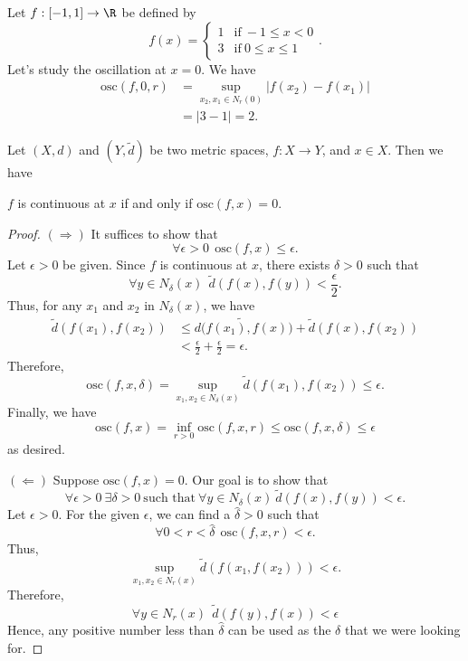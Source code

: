 \begin{eg}
    Let \( f:[-1,1] \to \R  \) be defined by 
    \[  f(x) = 
    \begin{cases}
        1 &\text{if} \ -1 \leq x < 0 \\ 
        3 &\text{if} \ 0 \leq x \leq 1 
    \end{cases}. \]
    Let's study the oscillation at \( x = 0  \). We have 
    \begin{align*}
        \text{osc}(f,0,r) &=  \sup_{{x}_{2},{x}_{1} \in {N}_{r}(0) } | f({x}_{2}) - f({x}_{1}) | \\
                          &= |  3 - 1  |  = 2.
    \end{align*}
\end{eg}

\begin{theorem}[ ]
    Let \( (X,d) \) and \( (Y, \tilde{d}) \) be two metric spaces, \( f: X \to Y  \), and \( x \in X  \). Then we have
    \begin{center}
        \( f  \) is continuous at \( x  \) if and only if \( \text{osc}(f,x) = 0 \).
    \end{center}
\end{theorem}
\begin{proof}
\( (\Longrightarrow) \) It suffices to show that 
\[  \forall \epsilon > 0 \ \ \text{osc}(f,x) \leq \epsilon. \]
Let \( \epsilon > 0  \) be given. Since \( f  \) is continuous at \( x  \), there exists \( \delta > 0  \) such that  
\[  \forall y \in {N}_{\delta}(x) \ \ \tilde{d}(f(x), f(y)) < \frac{ \epsilon }{ 2 }. \]
Thus, for any \( {x}_{1} \) and \( {x}_{2}  \) in \( {N}_{\delta}(x)  \), we have 
\begin{align*}
    \tilde{d}(f({x}_{1}), f({x}_{2})) &\leq \tilde{d(f({x}_{1}), f(x)} ) + \tilde{d}(f(x), f({x}_{2})) \\
                                      &< \frac{ \epsilon }{ 2 }  + \frac{ \epsilon }{ 2 }  = \epsilon.
\end{align*}
Therefore, 
\[  \text{osc}(f,x,\delta) = \sup_{{x}_{1}, {x}_{2} \in {N}_{\delta}(x)} \tilde{d}(f({x}_{1}), f({x}_{2})) \leq \epsilon. \]
Finally, we have 
\[  \text{osc}(f,x) = \inf_{r > 0} \text{osc}(f,x,r) \leq \text{osc}(f,x,\delta) \leq \epsilon \]
as desired.

\( (\Longleftarrow) \) Suppose \( \text{osc}(f,x) = 0  \). Our goal is to show that 
\[  \forall \epsilon > 0 \ \exists \delta > 0 \ \text{such that} \ \forall y \in {N}_{\delta}(x) \ \tilde{d}(f(x) , f(y)) < \epsilon. \tag{*} \]
Let \( \epsilon > 0  \). For the given \( \epsilon  \), we can find a \( \hat{\delta} > 0  \) such that  
\[  \forall 0 < r < \hat{\delta} \ \ \text{osc}(f,x,r) < \epsilon. \]
Thus, 
\[  \sup_{{x}_{1}, {x}_{2} \in {N}_{r}(x)} \tilde{d}(f({x}_{1}, f({x}_{2})))  < \epsilon. \]
Therefore,  
\[  \forall y \in {N}_{r}(x) \ \ \tilde{d} (f(y) , f(x)) < \epsilon \]
Hence, any positive number less than \( \hat{\delta}  \) can be used as the \( \delta  \) that we were looking for.
\end{proof}

